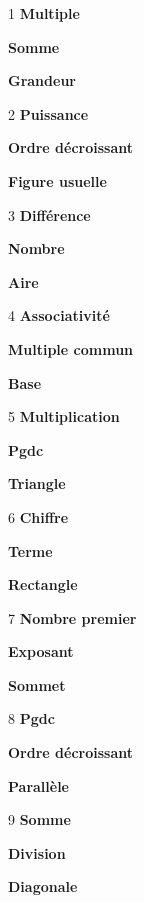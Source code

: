 \begin{tcbraster}[raster columns=3, raster column skip=0pt, raster row skip=0pt, raster valign=top]
\begin{fiche}{1}
\textbf{\large Multiple}\par
\textbf{\large Somme}\par
\textbf{\large Grandeur}
\end{fiche}
\begin{fiche}{2}
\textbf{\large Puissance}\par
\textbf{\large Ordre décroissant}\par
\textbf{\large Figure usuelle}
\end{fiche}
\begin{fiche}{3}
\textbf{\large Différence}\par
\textbf{\large Nombre}\par
\textbf{\large Aire}
\end{fiche}
\begin{fiche}{4}
\textbf{\large Associativité}\par
\textbf{\large Multiple commun}\par
\textbf{\large Base}
\end{fiche}
\begin{fiche}{5}
\textbf{\large Multiplication}\par
\textbf{\large Pgdc}\par
\textbf{\large Triangle}
\end{fiche}
\begin{fiche}{6}
\textbf{\large Chiffre}\par
\textbf{\large Terme}\par
\textbf{\large Rectangle}
\end{fiche}
\begin{fiche}{7}
\textbf{\large Nombre premier}\par
\textbf{\large Exposant}\par
\textbf{\large Sommet}
\end{fiche}
\begin{fiche}{8}
\textbf{\large Pgdc}\par
\textbf{\large Ordre décroissant}\par
\textbf{\large Parallèle}
\end{fiche}
\begin{fiche}{9}
\textbf{\large Somme}\par
\textbf{\large Division}\par
\textbf{\large Diagonale}
\end{fiche}

\end{tcbraster}
